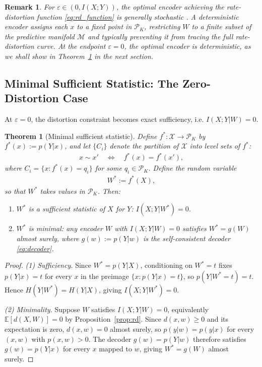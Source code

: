 \documentclass[11pt]{article}
\newtheorem{theorem}{Theorem}
\newtheorem{remark}{Remark}
\begin{document}
\begin{remark}
\label{rem:stochastic}
For $\varepsilon\in(0,I(X;Y))$, the optimal encoder achieving
the rate-distortion function \eqref{eq:rd_function} is generally stochastic
\cite{strouse2017deterministic}.
A deterministic encoder assigns each $x$ to a fixed point in
$\mathcal{P}_K$, restricting $W$ to a finite subset of the predictive
manifold $\mathcal{M}$ and typically preventing it from tracing the full
rate-distortion curve.
At the endpoint $\varepsilon=0$, the optimal encoder is deterministic,
as we shall show in Theorem~\ref{thm:mss} in the next section.
\end{remark}

\subsection{Minimal Sufficient Statistic: The Zero-Distortion Case}

At $\varepsilon=0$, the distortion constraint becomes exact sufficiency, i.e.
$I(X;Y|W)=0$.

\begin{theorem}[Minimal sufficient statistic]
\label{thm:mss}
Define $f^*:\mathcal{X}\to\mathcal{P}_K$ by $f^*(x):=p(Y|x)$, and let
$\{C_i\}$ denote the partition of $\mathcal{X}$ into level sets of $f^*$:
\begin{align}
    x \sim x' \quad \Longleftrightarrow \quad f^*(x)=f^*(x'),
    \label{eq:equiv}
\end{align}
where $C_i=\{x:f^*(x)=q_i\}$ for some $q_i\in\mathcal{P}_K$.
Define the random variable
\begin{align}
    W^* := f^*(X),
    \label{eq:mss}
\end{align}
so that $W^*$ takes values in $\mathcal{P}_K$. Then:
\begin{enumerate}
    \item $W^*$ is a sufficient statistic of $X$ for $Y$:
    $I(X;Y|W^*)=0$.
    \item $W^*$ is minimal: any encoder $W$ with $I(X;Y|W)=0$
    satisfies $W^*=g(W)$ almost surely, where $g(w):=p(Y|w)$ is the
    self-consistent decoder \eqref{eq:decoder}.
\end{enumerate}
\end{theorem}

\begin{proof}
\textit{(1) Sufficiency.}
Since $W^*=p(Y|X)$, conditioning on $W^*=t$ fixes $p(Y|x)=t$ for
every $x$ in the preimage $\{x:p(Y|x)=t\}$, so $p(Y|W^*=t)=t$.
Hence $H(Y|W^*)=H(Y|X)$, giving $I(X;Y|W^*)=0$.

\textit{(2) Minimality.}
Suppose $W$ satisfies $I(X;Y|W)=0$, equivalently
$\mathbb{E}[d(X,W)]=0$ by Proposition~\ref{prop:rd}.
Since $d(x,w)\geq 0$ and its expectation is zero, $d(x,w)=0$ almost
surely, so $p(y|w)=p(y|x)$ for every $(x,w)$ with $p(x,w)>0$.
The decoder $g(w)=p(Y|w)$ therefore satisfies $g(w)=p(Y|x)$
for every $x$ mapped to $w$, giving $W^*=g(W)$ almost surely.
\end{proof}
\end{document}
